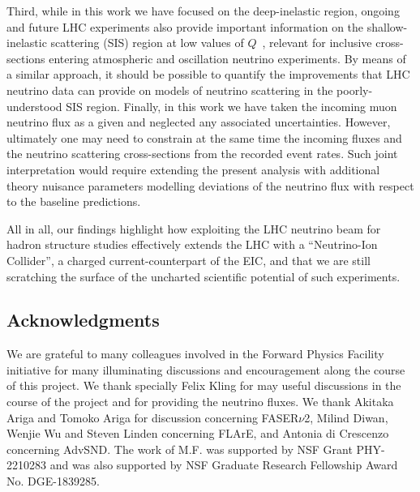 Third, while in this work we have focused on the deep-inelastic
region, ongoing and future LHC experiments also provide
important information on the shallow-inelastic scattering (SIS)
region at low values of $Q$~\cite{Candido:2023utz}, relevant for inclusive cross-sections
entering atmospheric and oscillation neutrino experiments.
%
By means of a similar approach, it should be possible to quantify
the improvements that LHC neutrino data can provide on models
of neutrino scattering in the poorly-understood SIS region.
%
Finally, in this work we have taken the incoming muon neutrino flux
as a given and neglected any associated uncertainties.
%
However, ultimately one may need to constrain at the same time
the incoming fluxes and the neutrino scattering cross-sections
from the recorded event rates.
%
Such joint interpretation would require extending the present
analysis with additional theory nuisance parameters modelling
deviations of the neutrino flux with respect to the baseline predictions.

All in all, our findings highlight how exploiting
the LHC neutrino beam for hadron structure studies effectively
extends the LHC with a ``Neutrino-Ion Collider'', a charged
current-counterpart of the EIC, and that we are still
scratching the surface of the uncharted
scientific potential of such experiments.

\subsection*{Acknowledgments}
%
We are grateful to many colleagues involved in the Forward
Physics Facility initiative for many illuminating
discussions and encouragement along the course of this project.
%
We thank specially Felix Kling for may useful discussions in the course
of the project and for providing the neutrino fluxes.
%
We thank Akitaka Ariga and Tomoko Ariga for discussion
concerning FASER$\nu$2, Milind Diwan,
Wenjie Wu and Steven Linden concerning FLArE,
and Antonia di Crescenzo concerning AdvSND. The work of M.F. was supported by NSF Grant PHY-2210283 and was also supported by NSF Graduate Research Fellowship Award No. DGE-1839285.
